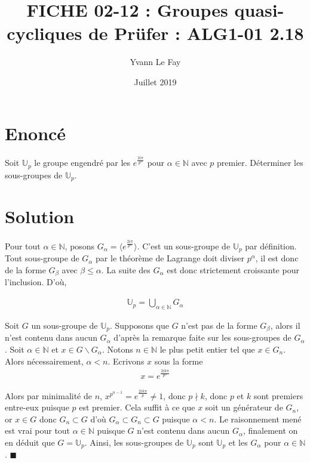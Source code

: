 \documentclass{article}
\newcommand*{\QED}{\hfill\ensuremath{\blacksquare}}%
\begin{document}
\title{FICHE 02-12 : Groupes quasi-cycliques de Prüfer : ALG1-01 2.18}
\author{Yvann Le Fay}
\date{Juillet 2019}
\maketitle
\section*{Enoncé}
Soit $\mathbb{U}_p$ le groupe engendré par les $e^{\frac{2i\pi}{p^\alpha}}$ pour $\alpha\in\mathbb{N}$ avec $p$ premier. Déterminer les sous-groupes de $\mathbb{U}_p$.
\section*{Solution}
Pour tout $\alpha\in \mathbb{N}$, posons $G_{\alpha} = \langle e^{\frac{2i\pi}{p^{\alpha}}}\rangle$. C'est un sous-groupe de $\mathbb{U}_p$ par définition. Tout sous-groupe de $G_{\alpha}$ par le théorème de Lagrange doit diviser $p^{\alpha}$, il est donc de la forme $G_{\beta}$ avec $\beta \leq \alpha$. La suite des $G_{\alpha}$ est donc strictement croissante pour l'inclusion. D'où, 

\begin{align*}
	\mathbb{U}_p = \bigcup_{\alpha\in\mathbb{N}} G_{\alpha}
\end{align*}

Soit $G$ un sous-groupe de $\mathbb{U}_p$. Supposons que $G$ n'est pas de la forme $G_{\beta}$, alors il n'est contenu dans aucun $G_{\alpha}$ d'après la remarque faite sur les sous-groupes de $G_{\alpha}$. Soit $\alpha\in\mathbb{N}$ et $x\in G\backslash G_{\alpha}$. Notons $n\in\mathbb{N}$ le plus petit entier tel que $x \in G_n$. Alors nécessairement, $\alpha < n$. Ecrivons $x$ sous la forme
\begin{align*}
	x = e^{\frac{2ik\pi}{p^n}}
\end{align*}

Alors par minimalité de $n$, $x^{p^{n-1}} = e^{\frac{2ik\pi}{p}}\neq 1$, donc $p\nmid k$, donc $p$ et $k$ sont premiers entre-eux puisque $p$ est premier. Cela suffit à ce que $x$ soit un générateur de $G_n$, or $x\in G$ donc $G_n\subset G$ d'où $G_{\alpha}\subset G_n\subset G$ puisque $\alpha < n$. Le raisonnement mené est vrai pour tout $\alpha\in\mathbb{N}$ puisque $G$ n'est contenu dans aucun $G_{\alpha}$, finalement on en déduit que $G = \mathbb{U}_p$. Ainsi, les sous-groupes de $\mathbb{U}_p$ sont $\mathbb{U}_p$ et les $G_{\alpha}$ pour $\alpha \in \mathbb{N}$.
\QED
\end{document}
